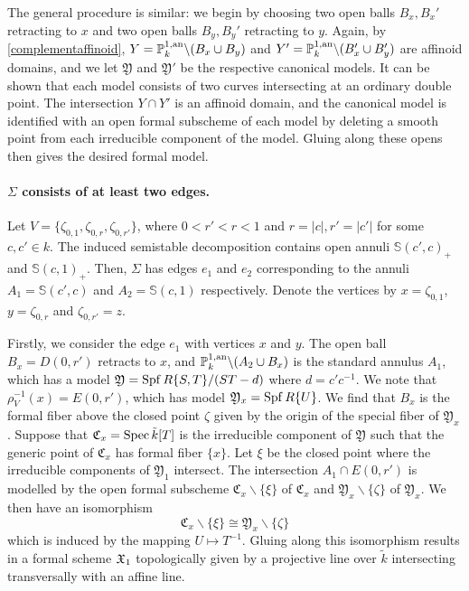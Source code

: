 The general procedure is similar: we begin by choosing two open balls $B_x, B_x'$ retracting to $x$ and two open balls $B_y, B_y'$ retracting to $y$.
Again, by \cref{complementaffinoid}, $Y = \mathbb{P}^{1, \text{an}}_{k} \backslash (B_x \cup B_y)$ and $Y' = \mathbb{P}^{1, \text{an}}_{k} \backslash (B'_x \cup B'_y)$ are affinoid domains, and we let $\mathfrak{Y}$ and $\mathfrak{Y}'$ be the respective canonical models.
It can be shown that each model consists of two curves intersecting at an ordinary double point.
The intersection $Y \cap Y'$ is an affinoid domain, and the canonical model is identified with an open formal subscheme of each model by deleting a smooth point from each irreducible component of the model.
Gluing along these opens then gives the desired formal model.

\paragraph{$\Sigma$ consists of at least two edges.}

Let $V = \{\zeta_{0, 1}, \zeta_{0, r}, \zeta_{0, r'} \}$, where $0 < r' < r < 1$ and $r = |c|, r' = |c'|$ for some $c, c' \in k$.
The induced semistable decomposition contains open annuli $\mathbb{S}(c', c)_+$ and $\mathbb{S}(c, 1)_{+}$.
Then, $\Sigma$ has edges $e_1$ and $e_2$ corresponding to the annuli $A_1 = \mathbb{S}(c', c)$ and $A_2 = \mathbb{S}(c, 1)$ respectively.
Denote the vertices by $x = \zeta_{0, 1}$, $y = \zeta_{0, r}$ and $\zeta_{0, r'} = z$.

Firstly, we consider the edge $e_1$ with vertices $x$ and $y$.
The open ball $B_x = D(0, r')$ retracts to $x$, and $\mathbb{P}^{1, \text{an}}_{k} \backslash (A_2 \cup B_x)$ is the standard annulus $A_1$, which has a model $\mathfrak{Y} = \operatorname{Spf} R\{S, T\}/(S T - d)$ where $d = c' c^{-1}$.
We note that $\rho_V^{-1}(x) = E(0, r')$, which has model $\mathfrak{Y}_x = \operatorname{Spf} R\{U\}$.
We find that $B_x$ is the formal fiber above the closed point $\zeta$ given by the origin of the special fiber of $\mathfrak{Y}_x$.
Suppose that $\mathfrak{C}_x = \operatorname{Spec} \tilde{k}[T]$ is the irreducible component of $\mathfrak{Y}$ such that the generic point of $\mathfrak{C}_x$ has formal fiber $\{x\}$.
Let $\xi$ be the closed point where the irreducible components of $\mathfrak{Y}_1$ intersect.
The intersection $A_1 \cap E(0, r')$ is modelled by the open formal subscheme $\mathfrak{C}_x \backslash \{ \xi \}$ of $\mathfrak{C}_x$ and $\mathfrak{Y}_x \backslash \{ \zeta \}$ of $\mathfrak{Y}_x$.
We then have an isomorphism
\[
    \mathfrak{C}_x \backslash \{ \xi \} \cong \mathfrak{Y}_x \backslash \{ \zeta \}
\]
which is induced by the mapping $U \mapsto T^{-1}$.
Gluing along this isomorphism results in a formal scheme $\mathfrak{X}_1$ topologically given by a projective line over $\tilde{k}$ intersecting transversally with an affine line.

